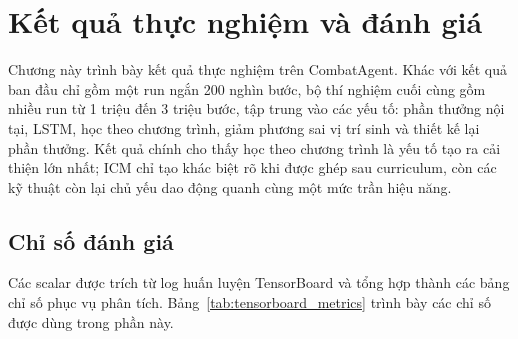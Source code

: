 \clearpage
{}

\setcounter{chapter}{3}
\chapter[{KẾT QUẢ THỰC NGHIỆM VÀ ĐÁNH GIÁ}]{Kết quả thực nghiệm và đánh giá}

Chương này trình bày kết quả thực nghiệm trên CombatAgent. Khác với kết quả ban đầu chỉ gồm một run ngắn 200 nghìn bước, bộ thí nghiệm cuối cùng gồm nhiều run từ 1 triệu đến 3 triệu bước, tập trung vào các yếu tố: phần thưởng nội tại, LSTM, học theo chương trình, giảm phương sai vị trí sinh và thiết kế lại phần thưởng. Kết quả chính cho thấy học theo chương trình là yếu tố tạo ra cải thiện lớn nhất; ICM chỉ tạo khác biệt rõ khi được ghép sau curriculum, còn các kỹ thuật còn lại chủ yếu dao động quanh cùng một mức trần hiệu năng.

\section{Chỉ số đánh giá}

Các scalar được trích từ log huấn luyện TensorBoard và tổng hợp thành các bảng chỉ số phục vụ phân tích. Bảng~\ref{tab:tensorboard_metrics} trình bày các chỉ số được dùng trong phần này.

